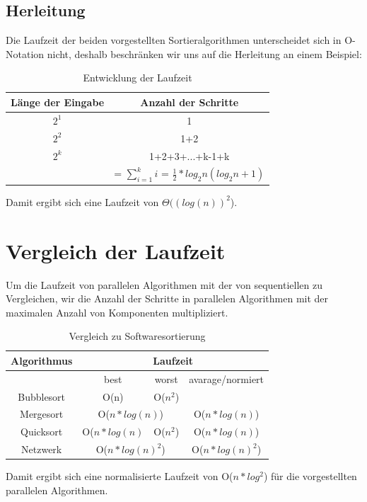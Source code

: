 \documentclass[11pt,ngerman]{article}
\begin{document}
\subsection{Herleitung}
Die Laufzeit der beiden vorgestellten Sortieralgorithmen unterscheidet sich in O-Notation nicht, deshalb beschränken wir uns auf die Herleitung an einem Beispiel:\\
\begin{table}[!h]
\begin{center}
	\begin{tabular}{c | c}
		Länge der Eingabe & Anzahl der Schritte \\ \hline
		$2^1$ & 1 \\
		$2^2$ & 1+2 \\
		$2^k$ & 1+2+3+...+k-1+k \\
		& = $\sum_{i=1}^ki$ = $\frac{1}{2} * log_2n (log_2n +1) $
	\end{tabular}
\end{center}
\caption{Entwicklung der Laufzeit}
\end{table}
\FloatBarrier
Damit ergibt sich eine Laufzeit von $\Theta((log(n))^2$). 
\section{Vergleich der Laufzeit}
Um die Laufzeit von parallelen Algorithmen mit der von sequentiellen zu Vergleichen, wir die Anzahl der Schritte in parallelen Algorithmen mit der maximalen Anzahl von Komponenten multipliziert.\\
\begin{table}[]
\begin{center}
	\begin{tabular}{c|c|c|c}
		Algorithmus & \multicolumn{3}{|c}{Laufzeit} \\ \hline
		& best & worst & avarage/normiert \\ \cline{2-4}
		Bubblesort & O(n) & O($n^2$) & \\
		Mergesort & \multicolumn{2}{|c|}{O($n * log(n)$)} & {O($n * log(n)$)} \\ 
		Quicksort & {O($n * log(n)$} & O($n^2$) & {O($n * log(n)$)} \\
		Netzwerk & \multicolumn{2}{|c|}{O($n * log(n)^2$)} & O($n * log(n)^2$) \\
	\end{tabular}
\end{center}
\caption{Vergleich zu Softwaresortierung}
\end{table}
\FloatBarrier
Damit ergibt sich eine normalisierte Laufzeit von O($n*log^2$) für die vorgestellten parallelen Algorithmen.
\end{document}
